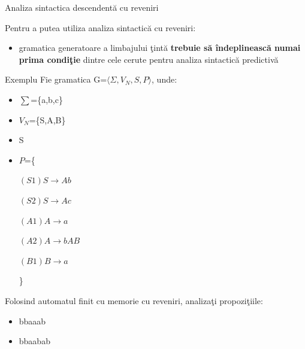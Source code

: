 \documentclass[pdf]{beamer}
\begin{document}
\begin{frame}{Analiza sintactica descendentă cu reveniri}

Pentru a putea utiliza analiza sintactică cu reveniri:

\begin{itemize}
\item
gramatica generatoare a limbajului ţintă \textbf{trebuie să îndeplinească numai prima condiţie} dintre cele cerute pentru analiza sintactică predictivă
\end{itemize}

\end{frame}



\begin{frame}{Exemplu}
Fie gramatica G=$\langle \Sigma, V_N, S, P \rangle$, unde:

\begin{itemize}
\item
$\sum$=\{a,b,c\}
\item
$V_N$=\{S,A,B\}
\item
S
\item
$P$=\{

\hspace{1cm} $(S1)	S \rightarrow Ab$

\hspace{1cm} $(S2)	S \rightarrow Ac$

\hspace{1cm} $(A1)	A \rightarrow a$

\hspace{1cm} $(A2)	A \rightarrow bAB$

\hspace{1cm} $(B1)	B \rightarrow a$

\}
\end{itemize}

Folosind automatul finit cu memorie cu reveniri, analizaţi propoziţiile:

\begin{itemize}
\item
bbaaab

\item
bbaabab

\end{itemize}
\end{frame}
\end{document}
